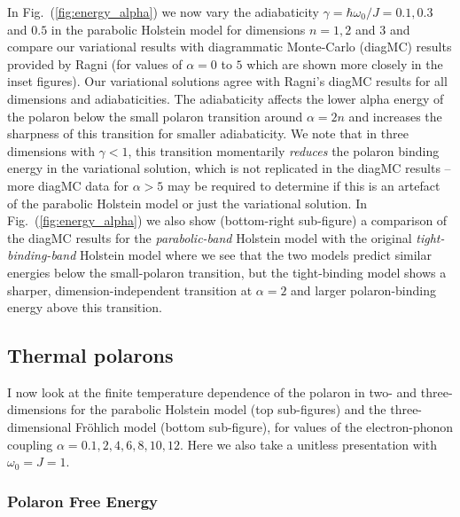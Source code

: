 In Fig.~(\ref{fig:energy_alpha}) we now vary the adiabaticity $\gamma = \hbar\omega_0/J = 0.1, 0.3$ and $0.5$ in the parabolic Holstein model for dimensions $n = 1, 2$ and $3$ and compare our variational results with diagrammatic Monte-Carlo (diagMC) results provided by Ragni (for values of $\alpha = 0$ to $5$ which are shown more closely in the inset figures). Our variational solutions agree with Ragni's diagMC results for all dimensions and adiabaticities. The adiabaticity affects the lower alpha energy of the polaron below the small polaron transition around $\alpha = 2n$ and increases the sharpness of this transition for smaller adiabaticity. We note that in three dimensions with $\gamma < 1$, this transition momentarily \emph{reduces} the polaron binding energy in the variational solution, which is not replicated in the diagMC results --  more diagMC data for $\alpha > 5$ may be required to determine if this is an artefact of the parabolic Holstein model or just the variational solution. In Fig.~(\ref{fig:energy_alpha}) we also show (bottom-right sub-figure) a comparison of the diagMC results for the \emph{parabolic-band} Holstein model with the original \emph{tight-binding-band} Holstein model where we see that the two models predict similar energies below the small-polaron transition, but the tight-binding model shows a sharper, dimension-independent transition at $\alpha = 2$ and larger polaron-binding energy above this transition.

\subsection{Thermal polarons}

I now look at the finite temperature dependence of the polaron in two- and three-dimensions for the parabolic Holstein model (top sub-figures) and the three-dimensional Fr\"ohlich model (bottom sub-figure), for values of the electron-phonon coupling $\alpha = 0.1, 2, 4, 6, 8, 10, 12$. Here we also take a unitless presentation with $\omega_0 = J = 1$. 

\subsubsection{Polaron Free Energy}

